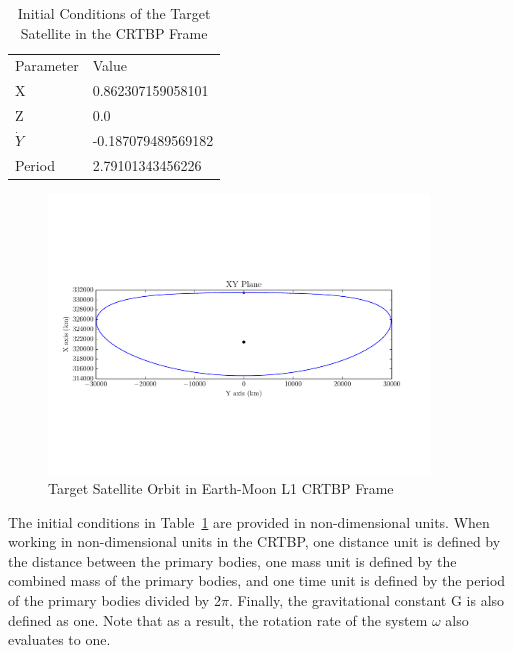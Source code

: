 \documentclass[letterpaper, preprint, paper,11pt]{AAS}	%
\begin{document}
\begin{table}[h] 
	\begin{center}
		\begin{tabular}{l l}
			Parameter   & Value \\
			X                & 0.862307159058101 \\
			Z                & 0.0 \\
			\(\dot{Y}\)      & -0.187079489569182 \\
			Period           & 2.79101343456226 \\
		\end{tabular}
		\caption{Initial Conditions of the Target Satellite in the CRTBP Frame}
		\label{tab:IC_1}
	\end{center}
\end{table}

\begin{figure}[h]
	\begin{center}
		\includegraphics[width=0.9\textwidth]{Target_Full_Orbit_1}
		\caption{Target Satellite Orbit in Earth-Moon L1 CRTBP Frame}
		\label{fig:FullOrbit_1}
	\end{center}
\end{figure}

The initial conditions in Table~\ref{tab:IC_1} are provided in non-dimensional units. When working in non-dimensional units in the CRTBP, one distance unit is defined by the distance between the primary bodies, one mass unit is defined by the combined mass of the primary bodies, and one time unit is defined by the period of the primary bodies divided by 2\(\pi\).  Finally, the gravitational constant G is also defined as one. Note that as a result, the rotation rate of the system \(\omega\) also evaluates to one. 
\end{document}

